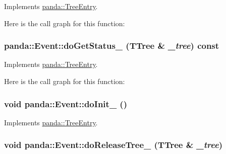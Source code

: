 Implements \hyperlink{classpanda_1_1TreeEntry_a62e77d9db1eec7032b1e31e5edc78a10}{panda::TreeEntry}.

Here is the call graph for this function:\hypertarget{classpanda_1_1Event_a1bd8a01f111c4e14a921a560caef6821}{
\subsubsection[{doGetStatus\_\-}]{ panda::Event::doGetStatus\_\- (TTree \& {\em \_\-tree}) const}}
\label{classpanda_1_1Event_a1bd8a01f111c4e14a921a560caef6821}


Implements \hyperlink{classpanda_1_1TreeEntry_a649d4a6f2719b68d54c6a7505f5f3105}{panda::TreeEntry}.

Here is the call graph for this function:\hypertarget{classpanda_1_1Event_a7907201dc93916ed71696bc276793c80}{
\subsubsection[{doInit\_\-}]{\setlength{\rightskip}{0pt plus 5cm}void panda::Event::doInit\_\- ()}}
\label{classpanda_1_1Event_a7907201dc93916ed71696bc276793c80}


Implements \hyperlink{classpanda_1_1TreeEntry_ab78cd4dfd6c017222db541580983fb65}{panda::TreeEntry}.\hypertarget{classpanda_1_1Event_a63ef383a11be99bbf46771468557c89a}{
\subsubsection[{doReleaseTree\_\-}]{\setlength{\rightskip}{0pt plus 5cm}void panda::Event::doReleaseTree\_\- (TTree \& {\em \_\-tree})}}
\label{classpanda_1_1Event_a63ef383a11be99bbf46771468557c89a}


